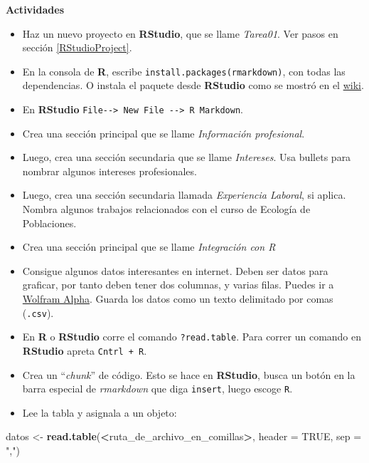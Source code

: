 \documentclass[12pt,letterpaper,]{book}
\newenvironment{Shaded}{\begin{snugshade}}{\end{snugshade}}
\newcommand{\KeywordTok}[1]{\textcolor[rgb]{0.13,0.29,0.53}{\textbf{#1}}}
\newcommand{\DataTypeTok}[1]{\textcolor[rgb]{0.13,0.29,0.53}{#1}}
\newcommand{\StringTok}[1]{\textcolor[rgb]{0.31,0.60,0.02}{#1}}
\newcommand{\OtherTok}[1]{\textcolor[rgb]{0.56,0.35,0.01}{#1}}
\newcommand{\OperatorTok}[1]{\textcolor[rgb]{0.81,0.36,0.00}{\textbf{#1}}}
\newcommand{\NormalTok}[1]{#1}
\begin{document}
\textbf{Actividades}

\begin{itemize}
\item
  Haz un nuevo proyecto en \textbf{RStudio}, que se llame
  \emph{Tarea01}. Ver pasos en sección \ref{RStudioProject}.
\item
  En la consola de \textbf{R}, escribe
  \texttt{install.packages(rmarkdown)}, con todas las dependencias. O
  instala el paquete desde \textbf{RStudio} como se mostró en el
  \href{https://github.com/dawidh15/dinPob/wiki/02-Instalaci\%C3\%B3n-del-software-necesario}{wiki}.
\item
  En \textbf{RStudio}
  \texttt{File-\/-\textgreater{}\ New\ File\ -\/-\textgreater{}\ R\ Markdown}.
\item
  Crea una sección principal que se llame \emph{Información
  profesional}.
\item
  Luego, crea una sección secundaria que se llame \emph{Intereses}. Usa
  bullets para nombrar algunos intereses profesionales.
\item
  Luego, crea una sección secundaria llamada \emph{Experiencia Laboral},
  si aplica. Nombra algunos trabajos relacionados con el curso de
  Ecología de Poblaciones.
\item
  Crea una sección principal que se llame \emph{Integración con R}
\item
  Consigue algunos datos interesantes en internet. Deben ser datos para
  graficar, por tanto deben tener dos columnas, y varias filas. Puedes
  ir a \href{https://www.wolframalpha.com/}{Wolfram Alpha}. Guarda los
  datos como un texto delimitado por comas (\texttt{.csv}).
\item
  En \textbf{R} o \textbf{RStudio} corre el comando
  \texttt{?read.table}. Para correr un comando en \textbf{RStudio}
  apreta \texttt{Cntrl\ +\ R}.
\item
  Crea un ``\emph{chunk}'' de código. Esto se hace en \textbf{RStudio},
  busca un botón en la barra especial de \emph{rmarkdown} que diga
  \texttt{insert}, luego escoge \texttt{R}.
\item
  Lee la tabla y asignala a un objeto:
\end{itemize}

\begin{Shaded}
\begin{Highlighting}[]
\NormalTok{datos <-}\StringTok{ }\KeywordTok{read.table}\NormalTok{(}\OperatorTok{<}\NormalTok{ruta_de_archivo_en_comillas}\OperatorTok{>}\NormalTok{,}
                    \DataTypeTok{header =} \OtherTok{TRUE}\NormalTok{,}
                    \DataTypeTok{sep =} \StringTok{","}\NormalTok{)}
\end{Highlighting}
\end{Shaded}
\end{document}

